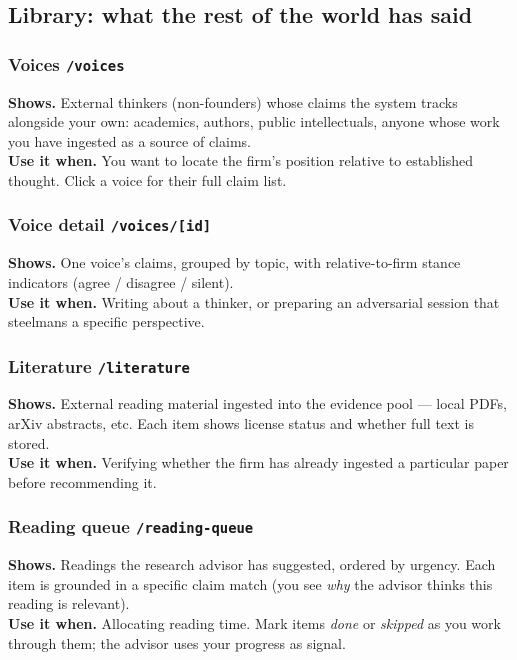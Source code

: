 \documentclass[11pt,letterpaper]{article}
\newcommand{\file}[1]{\texttt{#1}}
\newcommand{\tab}[1]{\textsl{#1}}
\begin{document}
\subsection{Library: what the rest of the world has said}

\subsubsection*{Voices \hfill \file{/voices}}
\textbf{Shows.} External thinkers (non-founders) whose claims the system tracks alongside your own: academics, authors, public intellectuals, anyone whose work you have ingested as a source of claims. \\
\textbf{Use it when.} You want to locate the firm's position relative to established thought. Click a voice for their full claim list.

\subsubsection*{Voice detail \hfill \file{/voices/[id]}}
\textbf{Shows.} One voice's claims, grouped by topic, with relative-to-firm stance indicators (agree / disagree / silent). \\
\textbf{Use it when.} Writing about a thinker, or preparing an adversarial session that steelmans a specific perspective.

\subsubsection*{Literature \hfill \file{/literature}}
\textbf{Shows.} External reading material ingested into the evidence pool --- local PDFs, arXiv abstracts, etc. Each item shows license status and whether full text is stored. \\
\textbf{Use it when.} Verifying whether the firm has already ingested a particular paper before recommending it.

\subsubsection*{Reading queue \hfill \file{/reading-queue}}
\textbf{Shows.} Readings the research advisor has suggested, ordered by urgency. Each item is grounded in a specific claim match (you see \emph{why} the advisor thinks this reading is relevant). \\
\textbf{Use it when.} Allocating reading time. Mark items \tab{done} or \tab{skipped} as you work through them; the advisor uses your progress as signal.
\end{document}
